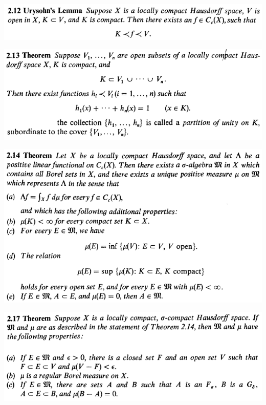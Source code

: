 \documentclass[12pt]{article}
\begin{document}
		\begin{center}
		\includegraphics{2ponto12}
		\end{center}

		\begin{center}
		\includegraphics{2ponto13}
		\end{center}

		\begin{center}
		\includegraphics{2ponto14}
		\end{center}

		\begin{center}
		\includegraphics{2ponto17}
		\end{center}
\end{document}
